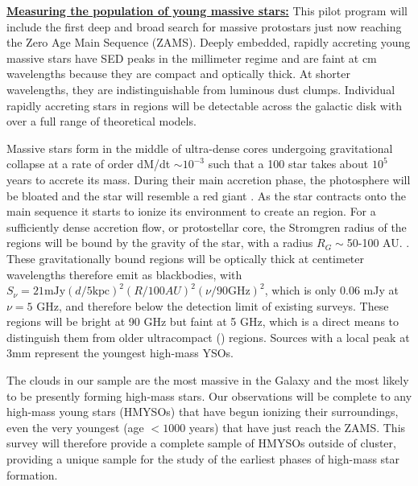 


\underline{\textbf{\helv Measuring the population of young massive stars:}}
This pilot program will include the
first deep and broad search for massive protostars just now reaching the Zero
Age Main Sequence (ZAMS).  Deeply embedded, rapidly accreting young massive stars have
SED peaks in the millimeter regime and are faint at cm wavelengths because they
are compact and optically thick.  At shorter wavelengths, they are
indistinguishable from luminous dust clumps.  Individual rapidly accreting
stars in \hchii regions will be detectable across the galactic disk with
\MUSTANG over a full range of theoretical models.

Massive stars form in the middle of ultra-dense cores undergoing gravitational
collapse at a rate of order dM/dt $\sim 10^{-3}$ \msun \peryr such that a 100
\msun star takes about $10^5$ years to accrete its mass.  During their main
accretion phase, the photosphere will be bloated and the star will resemble a
red giant \citep{Yorke2002a,Hosokawa2009a}.    As the star contracts onto the
main sequence it starts to ionize its environment to create an \hchii region.
For a sufficiently dense accretion flow, or protostellar core, the Stromgren
radius of the \hchii regions will be bound by the gravity of the star, with a
radius $R_G \sim$50-100 AU. \citep{Keto2002a,Keto2003a,Keto2007a}.  These
gravitationally bound \hchii regions will be optically thick at centimeter
wavelengths therefore emit as blackbodies, with $S_\nu=21 \textrm{mJy} (d/5
\textrm{kpc})^2 (R/100 AU)^2(\nu/90 \textrm{GHz})^2$, which is only 0.06 mJy at
$\nu=5$ GHz, and therefore below the detection limit of existing surveys.
These \hchii regions will be bright at 90 GHz but faint at 5 GHz, which is a
direct means to distinguish them from older ultracompact (\uchii) regions.
Sources with a local peak at 3mm represent the youngest high-mass YSOs.

The clouds in our sample are the most massive in the Galaxy and the most likely
to be presently forming high-mass stars.  Our observations will be complete to
any high-mass young stars (HMYSOs) that have begun ionizing their surroundings,
even the very youngest (age $<1000$ years) that have just reach the ZAMS.  This
survey will therefore provide a complete sample of HMYSOs outside of cluster,
providing a unique sample for the study of the earliest phases of high-mass
star formation.



